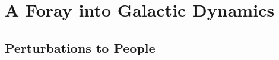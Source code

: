 \chapter{A Foray into Galactic Dynamics} \label{ch:introduction}
\newpage

\section{Perturbations to People}

